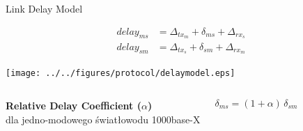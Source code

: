 \documentclass[compress,red]{beamer}
\begin{document}
% 
% 
% 
\begin{frame}{Link Delay Model}

  \begin{align}
    \nonumber delay_{ms} &= \Delta_{tx_m} + \delta_{ms} + \Delta_{rx_s} \\
    \nonumber delay_{sm} &= \Delta_{tx_s} + \delta_{sm} + \Delta_{rx_m}
  \end{align}

   \vspace{0.2cm}

  \begin{center}
  \texttt{[image: ../../figures/protocol/delaymodel.eps]}
  \end{center}

\begin{columns}[c]
  \column{2.8in}

    \begin{center}
      \textbf{Relative Delay Coefficient ($\alpha$)} \\
      dla jedno-modowego światłowodu 1000base-X
    \end{center}

  \column{1.5in}
    \begin{center}
      \begin{equation}
      \nonumber \delta_{ms} = (1 + \alpha) \, \delta_{sm}
      \end{equation}
    \end{center}
    \vspace{0.5cm}
\end{columns}
  

\end{frame}
\end{document}

